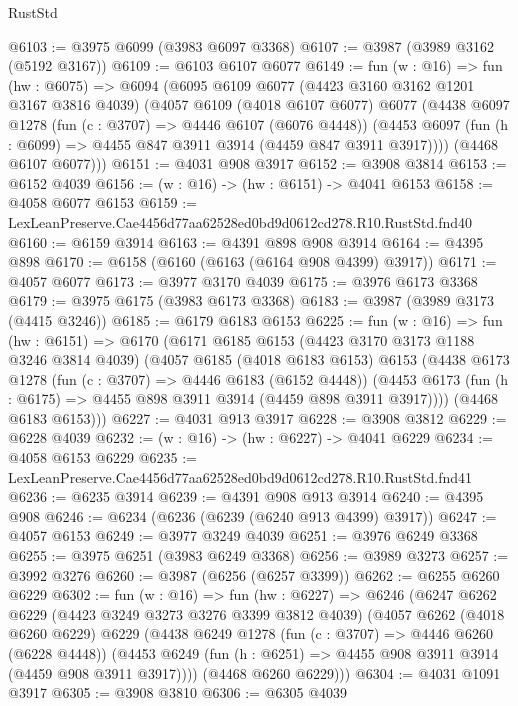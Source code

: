 \begin{lexlean}{RustStd}
\begin{coremodule}
@6103 := @3975 @6099 (@3983 @6097 @3368)
@6107 := @3987 (@3989 @3162 (@5192 @3167))
@6109 := @6103 @6107 @6077
@6149 := fun (w : @16) =>
  fun (hw : @6075) =>
  @6094
    (@6095
      @6109
      @6077
      (@4423 @3160 @3162 @1201 @3167 @3816 @4039)
      (@4057
        @6109
        (@4018 @6107 @6077)
        @6077
        (@4438
          @6097
          @1278
          (fun (c : @3707) => @4446 @6107 (@6076 @4448))
          (@4453 @6097 (fun (h : @6099) => @4455 @847 @3911 @3914 (@4459 @847 @3911 @3917))))
        (@4468 @6107 @6077)))
@6151 := @4031 @908 @3917
@6152 := @3908 @3814
@6153 := @6152 @4039
@6156 := (w : @16) -> (hw : @6151) -> @4041 @6153
@6158 := @4058 @6077 @6153
@6159 := LexLeanPreserve.Cae4456d77aa62528ed0bd9d0612cd278.R10.RustStd.fnd40
@6160 := @6159 @3914
@6163 := @4391 @898 @908 @3914
@6164 := @4395 @898
@6170 := @6158 (@6160 (@6163 (@6164 @908 @4399) @3917))
@6171 := @4057 @6077
@6173 := @3977 @3170 @4039
@6175 := @3976 @6173 @3368
@6179 := @3975 @6175 (@3983 @6173 @3368)
@6183 := @3987 (@3989 @3173 (@4415 @3246))
@6185 := @6179 @6183 @6153
@6225 := fun (w : @16) =>
  fun (hw : @6151) =>
  @6170
    (@6171
      @6185
      @6153
      (@4423 @3170 @3173 @1188 @3246 @3814 @4039)
      (@4057
        @6185
        (@4018 @6183 @6153)
        @6153
        (@4438
          @6173
          @1278
          (fun (c : @3707) => @4446 @6183 (@6152 @4448))
          (@4453 @6173 (fun (h : @6175) => @4455 @898 @3911 @3914 (@4459 @898 @3911 @3917))))
        (@4468 @6183 @6153)))
@6227 := @4031 @913 @3917
@6228 := @3908 @3812
@6229 := @6228 @4039
@6232 := (w : @16) -> (hw : @6227) -> @4041 @6229
@6234 := @4058 @6153 @6229
@6235 := LexLeanPreserve.Cae4456d77aa62528ed0bd9d0612cd278.R10.RustStd.fnd41
@6236 := @6235 @3914
@6239 := @4391 @908 @913 @3914
@6240 := @4395 @908
@6246 := @6234 (@6236 (@6239 (@6240 @913 @4399) @3917))
@6247 := @4057 @6153
@6249 := @3977 @3249 @4039
@6251 := @3976 @6249 @3368
@6255 := @3975 @6251 (@3983 @6249 @3368)
@6256 := @3989 @3273
@6257 := @3992 @3276
@6260 := @3987 (@6256 (@6257 @3399))
@6262 := @6255 @6260 @6229
@6302 := fun (w : @16) =>
  fun (hw : @6227) =>
  @6246
    (@6247
      @6262
      @6229
      (@4423 @3249 @3273 @3276 @3399 @3812 @4039)
      (@4057
        @6262
        (@4018 @6260 @6229)
        @6229
        (@4438
          @6249
          @1278
          (fun (c : @3707) => @4446 @6260 (@6228 @4448))
          (@4453 @6249 (fun (h : @6251) => @4455 @908 @3911 @3914 (@4459 @908 @3911 @3917))))
        (@4468 @6260 @6229)))
@6304 := @4031 @1091 @3917
@6305 := @3908 @3810
@6306 := @6305 @4039

\end{coremodule}
\end{lexlean}
